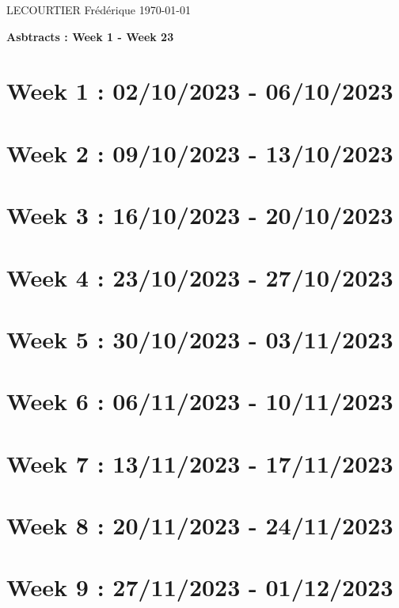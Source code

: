 \documentclass[french]{article}
\begin{document}
	LECOURTIER Frédérique \hfill \today
	\begin{center}
		\Large\textbf{{Asbtracts : Week 1 - Week 23}}
	\end{center}

	\section{Week 1 : 02/10/2023 - 06/10/2023}
	

	\section{Week 2 : 09/10/2023 - 13/10/2023}
	

	\section{Week 3 : 16/10/2023 - 20/10/2023}
	

	\section{Week 4 : 23/10/2023 - 27/10/2023}
	

	\section{Week 5 : 30/10/2023 - 03/11/2023}
	

	\section{Week 6 : 06/11/2023 - 10/11/2023}
	

	\section{Week 7 : 13/11/2023 - 17/11/2023}
	

	\section{Week 8 : 20/11/2023 - 24/11/2023}
	

	\section{Week 9 : 27/11/2023 - 01/12/2023}
	
\end{document}

